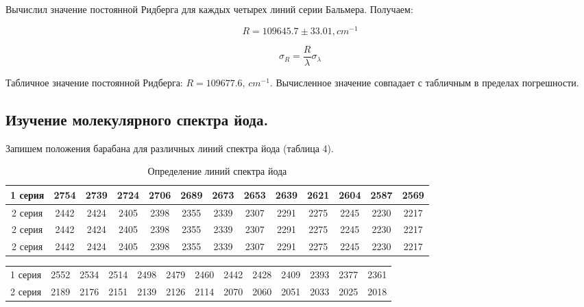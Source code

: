 \documentclass[14pt,a4paper]{scrartcl}
\begin{document}
\newpage

Вычислил значение постоянной Ридберга для каждых четырех линий серии Бальмера. Получаем:

$$R = 109645.7 \pm 33.01, cm^{-1}$$

$$\sigma_R = \frac{R}{\lambda} \sigma_\lambda$$

Табличное значение постоянной Ридберга: $R = 109677.6$, $cm^{-1}$. Вычисленное значение совпадает с табличным в пределах погрешности.






\subsection{Изучение молекулярного спектра йода.}

Запишем положения барабана для различных линий спектра йода (таблица 4).

		\begin{table}[h!]
		\caption{Определение линий спектра йода}
		\begin{center}
			\begin{tabular}{|c|c|c|c|c|c|c|c|c|c|c|c|c|}
				\hline 
			1 серия & 2754 & 2739 & 2724 & 2706 & 2689 & 2673 & 2653 & 2639 & 2621 & 2604 & 2587 & 2569 \\ \hline
		      
			2 серия & 2442 & 2424 & 2405 & 2398 & 2355 & 2339 & 2307 & 2291 & 2275 & 2245 & 2230 & 2217  \\
			2 серия & 2442 & 2424 & 2405 & 2398 & 2355 & 2339 & 2307 & 2291 & 2275 & 2245 & 2230 & 2217  \\
			2 серия & 2442 & 2424 & 2405 & 2398 & 2355 & 2339 & 2307 & 2291 & 2275 & 2245 & 2230 & 2217  \\
				\hline 
			\end{tabular} 
		\end{center}
		\label{table_mn}
	\end{table}

		\begin{table}[h!]

		\begin{center}
			\begin{tabular}{|c|c|c|c|c|c|c|c|c|c|c|c|c|}
				\hline 
			1 серия & 2552 & 2534 & 2514 & 2498 & 2479 & 2460 & 2442 & 2428 & 2409 & 2393 & 2377 & 2361 \\
		      
			2 серия & 2189 & 2176 & 2151 & 2139 & 2126 & 2114 & 2070 & 2060 & 2051 & 2033 & 2025 & 2018  \\
				\hline 
			\end{tabular} 
		\end{center}
		\label{table_mn}
	\end{table}
	
\end{document}
